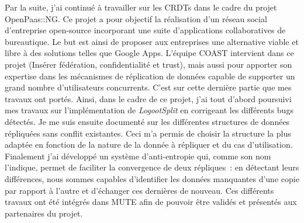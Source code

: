 \documentclass[11pt,a4paper,sans]{moderncv}        %
\newcommand{\tab}{\quad \quad}
\begin{document}

\tab Par la suite, j'ai continué à travailler sur les CRDTs dans le cadre du projet OpenPaas::NG.
Ce projet a pour objectif la réalisation d'un réseau social d'entreprise open-source
incorporant une suite d'applications collaboratives de bureautique.
Le but est ainsi de proposer aux entreprises
une alternative viable et libre à des solutions telles que Google Apps.
L'équipe COAST intervient dans ce projet (Insérer fédération, confidentialité et trust), mais aussi pour apporter
son expertise dans les mécanismes de réplication de données
capable de supporter un grand nombre d'utilisateurs concurrents.
C'est sur cette dernière partie que mes travaux ont portés.
Ainsi, dans le cadre de ce projet, j'ai tout d'abord poursuivi mes travaux
sur l'implémentation de \emph{LogootSplit} en corrigeant les différents bugs détectés.
Je me suis ensuite documenté sur les différentes
structures de données répliquées sans conflit existantes.
Ceci m'a permis de choisir la structure la plus adaptée
en fonction de la nature de la donnée à répliquer et du cas d'utilisation.
Finalement j'ai développé un système d'anti-entropie qui, comme son nom l'indique,
permet de faciliter la convergence de deux répliques~:
en détectant leurs différences, nous sommes capables d'identifier les données
manquantes d'une copie par rapport à l'autre et d'échanger ces dernières de nouveau.
Ces différents travaux ont été intégrés dans MUTE afin
de pouvoir être validés et présentés aux partenaires du projet.

\end{document}
